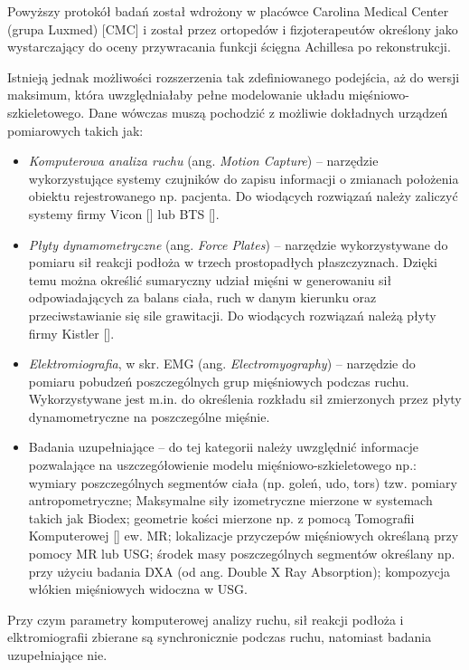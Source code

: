 Powyższy protokół badań został wdrożony w placówce Carolina Medical Center (grupa Luxmed) [CMC] i został przez ortopedów i fizjoterapeutów określony jako wystarczający do oceny przywracania funkcji ścięgna Achillesa po rekonstrukcji. 

Istnieją jednak możliwości rozszerzenia tak zdefiniowanego podejścia, aż do wersji maksimum, która uwzględniałaby pełne modelowanie układu mięśniowo-szkieletowego. Dane wówczas muszą pochodzić z możliwie dokładnych urządzeń pomiarowych takich jak:
\begin{itemize}
	\item \textit{Komputerowa analiza ruchu} (ang. \textit{Motion Capture}) -- narzędzie wykorzystujące systemy czujników do zapisu informacji o zmianach położenia obiektu rejestrowanego np. pacjenta. Do wiodących rozwiązań należy zaliczyć systemy firmy Vicon [] lub BTS [].
	\item \textit{Płyty dynamometryczne} (ang. \textit{Force Plates}) -- narzędzie wykorzystywane do pomiaru sił reakcji podłoża w trzech prostopadłych płaszczyznach. Dzięki temu można określić sumaryczny udział mięśni w generowaniu sił odpowiadających za balans ciała, ruch w danym kierunku oraz przeciwstawianie się sile grawitacji. Do wiodących rozwiązań należą płyty firmy Kistler [].
	\item \textit{Elektromiografia}, w skr. EMG (ang. \textit{Electromyography}) -- narzędzie do pomiaru pobudzeń poszczególnych grup mięśniowych podczas ruchu. Wykorzystywane jest m.in. do określenia rozkładu sił zmierzonych przez płyty dynamometryczne na poszczególne mięśnie.
	\item Badania uzupełniające -- do tej kategorii należy uwzględnić informacje pozwalające na uszczegółowienie modelu mięśniowo-szkieletowego np.: wymiary poszczególnych segmentów ciała (np. goleń, udo, tors) tzw. pomiary antropometryczne; Maksymalne siły izometryczne mierzone w systemach takich jak Biodex; geometrie kości mierzone np. z pomocą Tomografii Komputerowej [] ew. MR; lokalizacje przyczepów mięśniowych określaną przy pomocy MR lub USG; środek masy poszczególnych segmentów określany np. przy użyciu badania DXA (od ang. Double X Ray Absorption); kompozycja włókien mięśniowych widoczna w USG.
\end{itemize}

Przy czym parametry komputerowej analizy ruchu, sił reakcji podłoża i elktromiografii zbierane są synchronicznie podczas ruchu, natomiast badania uzupełniające nie. 

